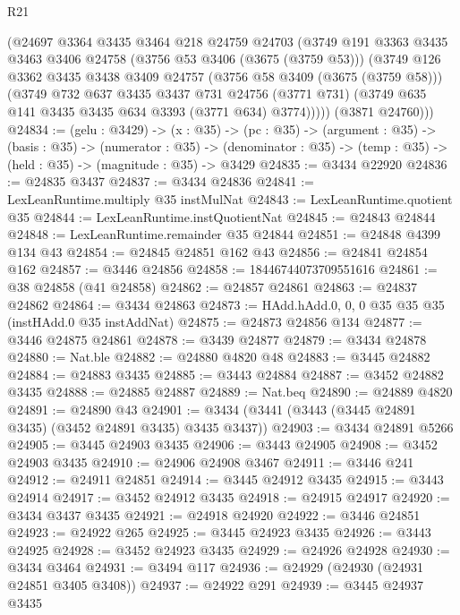 \begin{lexlean}{R21}
\begin{coremodule}
        (@24697
          @3364
          @3435
          @3464
          @218
          @24759
          @24703
          (@3749
            @191
            @3363
            @3435
            @3463
            @3406
            @24758
            (@3756 @53 @3406 (@3675 (@3759 @53)))
            (@3749
              @126
              @3362
              @3435
              @3438
              @3409
              @24757
              (@3756 @58 @3409 (@3675 (@3759 @58)))
              (@3749
                @732
                @637
                @3435
                @3437
                @731
                @24756
                (@3771 @731)
                (@3749 @635 @141 @3435 @3435 @634 @3393 (@3771 @634) @3774)))))
        (@3871 @24760)))
@24834 := (gelu : @3429) ->
  (x : @35) ->
  (pc : @35) ->
  (argument : @35) ->
  (basis : @35) ->
  (numerator : @35) ->
  (denominator : @35) -> (temp : @35) -> (held : @35) -> (magnitude : @35) -> @3429
@24835 := @3434 @22920
@24836 := @24835 @3437
@24837 := @3434 @24836
@24841 := LexLeanRuntime.multiply @35 instMulNat
@24843 := LexLeanRuntime.quotient @35
@24844 := LexLeanRuntime.instQuotientNat
@24845 := @24843 @24844
@24848 := LexLeanRuntime.remainder @35 @24844
@24851 := @24848 @4399 @134 @43
@24854 := @24845 @24851 @162 @43
@24856 := @24841 @24854 @162
@24857 := @3446 @24856
@24858 := 18446744073709551616
@24861 := @38 @24858 (@41 @24858)
@24862 := @24857 @24861
@24863 := @24837 @24862
@24864 := @3434 @24863
@24873 := HAdd.hAdd.{0, 0, 0} @35 @35 @35 (instHAdd.{0} @35 instAddNat)
@24875 := @24873 @24856 @134
@24877 := @3446 @24875 @24861
@24878 := @3439 @24877
@24879 := @3434 @24878
@24880 := Nat.ble
@24882 := @24880 @4820 @48
@24883 := @3445 @24882
@24884 := @24883 @3435
@24885 := @3443 @24884
@24887 := @3452 @24882 @3435
@24888 := @24885 @24887
@24889 := Nat.beq
@24890 := @24889 @4820
@24891 := @24890 @43
@24901 := @3434 (@3441 (@3443 (@3445 @24891 @3435) (@3452 @24891 @3435) @3435 @3437))
@24903 := @3434 @24891 @5266
@24905 := @3445 @24903 @3435
@24906 := @3443 @24905
@24908 := @3452 @24903 @3435
@24910 := @24906 @24908 @3467
@24911 := @3446 @241
@24912 := @24911 @24851
@24914 := @3445 @24912 @3435
@24915 := @3443 @24914
@24917 := @3452 @24912 @3435
@24918 := @24915 @24917
@24920 := @3434 @3437 @3435
@24921 := @24918 @24920
@24922 := @3446 @24851
@24923 := @24922 @265
@24925 := @3445 @24923 @3435
@24926 := @3443 @24925
@24928 := @3452 @24923 @3435
@24929 := @24926 @24928
@24930 := @3434 @3464
@24931 := @3494 @117
@24936 := @24929 (@24930 (@24931 @24851 @3405 @3408))
@24937 := @24922 @291
@24939 := @3445 @24937 @3435

\end{coremodule}
\end{lexlean}
